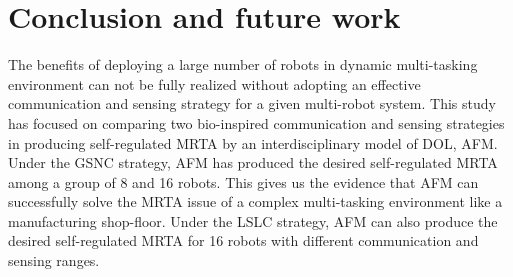 \documentclass[journal]{IEEEtran}
\begin{document}
\section{Conclusion and future work}
\label{sec:conc}
The benefits of deploying a large number of robots in dynamic multi-tasking environment can not be fully realized without adopting an effective communication and sensing strategy for a given multi-robot system. This study has focused on comparing two bio-inspired  communication and sensing strategies in producing self-regulated MRTA by an interdisciplinary model of DOL, AFM. Under the GSNC strategy, AFM has produced the desired self-regulated MRTA among a group of 8 and 16 robots. This gives us the evidence that AFM can successfully solve the MRTA issue of a complex multi-tasking environment like a manufacturing shop-floor. Under the LSLC strategy, AFM can also produce the desired self-regulated MRTA for 16 robots with different communication and sensing ranges.


%
% 
%
%
%
%
\end{document}
